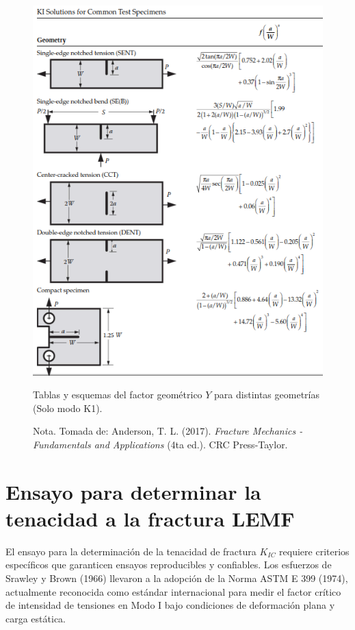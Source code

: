 \documentclass[12pt,letterpaper]{article}
\begin{document}
\begin{figure}[H]
    \centering
    \includegraphics[width=0.85\linewidth]{d.png} %
    \caption{Tablas y esquemas del factor geométrico $Y$ para distintas geometrías (Solo modo K1).}
    \label{fig:factor_intensidad_Y2}
    \caption*{Nota. Tomada de: Anderson, T. L. (2017). \textit{Fracture Mechanics - Fundamentals and Applications} (4ta ed.). CRC Press-Taylor.}\cite{anderson2017fracture}
\end{figure}

\section{Ensayo para determinar la tenacidad a la fractura LEMF}

El ensayo para la determinación de la tenacidad de fractura $K_{IC}$ requiere criterios específicos que garanticen ensayos reproducibles y confiables. Los esfuerzos de Srawley y Brown (1966) llevaron a la adopción de la Norma ASTM E 399 (1974), actualmente reconocida como estándar internacional para medir el factor crítico de intensidad de tensiones en Modo I bajo condiciones de deformación plana y carga estática.
\end{document}

